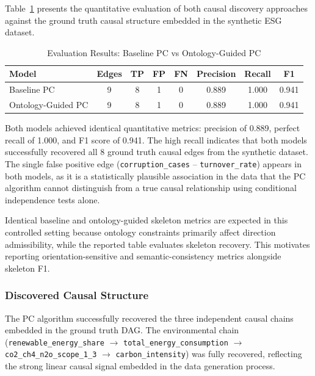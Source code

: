 \documentclass[a4paper,11pt,oneside]{article}
\begin{document}
Table~\ref{tab:results} presents the quantitative evaluation of both causal discovery approaches against the ground truth causal structure embedded in the synthetic ESG dataset.

\begin{table}[h]
\centering
\caption{Evaluation Results: Baseline PC vs Ontology-Guided PC}
\label{tab:results}
\begin{tabular}{lccccccc}
\toprule
\textbf{Model} & \textbf{Edges} & \textbf{TP} & \textbf{FP} & \textbf{FN} &
\textbf{Precision} & \textbf{Recall} & \textbf{F1} \\
\midrule
Baseline PC & 9 & 8 & 1 & 0 & 0.889 & 1.000 & 0.941 \\
Ontology-Guided PC & 9 & 8 & 1 & 0 & 0.889 & 1.000 & 0.941 \\
\bottomrule
\end{tabular}
\end{table}

Both models achieved identical quantitative metrics: precision of 0.889, perfect recall of 1.000, and F1 score of 0.941. The high recall indicates that both models successfully recovered all 8 ground truth causal edges from the synthetic dataset. The single false positive edge (\texttt{corruption\_cases} -- \texttt{turnover\_rate}) appears in both models, as it is a statistically plausible association in the data that the PC algorithm cannot distinguish from a true causal relationship using conditional independence tests alone.

Identical baseline and ontology-guided skeleton metrics are expected in this controlled setting because ontology constraints primarily affect direction admissibility, while the reported table evaluates skeleton recovery. This motivates reporting orientation-sensitive and semantic-consistency metrics alongside skeleton F1.

\subsubsection{Discovered Causal Structure}

The PC algorithm successfully recovered the three independent causal chains embedded in the ground truth DAG. The environmental chain
(\texttt{renewable\_energy\_share} $\rightarrow$ \texttt{total\_energy\_consumption} $\rightarrow$ \texttt{co2\_ch4\_n2o\_scope\_1\_3} $\rightarrow$ \texttt{carbon\_intensity}) was fully recovered, reflecting the strong linear causal signal embedded in the data generation process.
\end{document}
